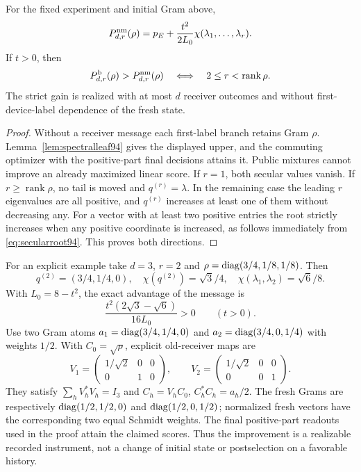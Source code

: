 \begin{corollary}\label{cor:messagevalue94}
For the fixed experiment and initial Gram above,
\begin{equation}\label{eq:nomessage94}
 P_{d,r}^{\rm nm}(\rho)
          =p_E+\frac{t^2}{2L_0}\chi(\lambda_1,\ldots,\lambda_r).
\end{equation}
If $t>0$, then
\begin{equation}\label{eq:messagestrict94}
 P_{d,r}^{\rm b}(\rho)>P_{d,r}^{\rm nm}(\rho)
                 \quad\Longleftrightarrow\quad
                      2\le r<\operatorname{rank}\rho.
\end{equation}
The strict gain is realized with at most $d$ receiver outcomes and
without first-device-label dependence of the fresh state.
\end{corollary}
\begin{proof}
Without a receiver message each first-label branch retains Gram
$\rho$.  Lemma~\ref{lem:spectralleaf94} gives the displayed upper,
and the commuting optimizer with the positive-part final decisions
attains it.  Public mixtures cannot improve an already maximized
linear score.  If $r=1$, both secular values vanish.  If
$r\ge\operatorname{rank}\rho$, no tail is moved and $q^{(r)}=\lambda$.
In the remaining case the leading $r$ eigenvalues are all positive,
and $q^{(r)}$ increases at least one of them without decreasing any.
For a vector with at least two positive entries the root strictly
increases when any positive coordinate is increased, as follows
immediately from \eqref{eq:secularroot94}.  This proves both directions.
\end{proof}

For an explicit example take $d=3$, $r=2$ and
$\rho=\operatorname{diag}(3/4,1/8,1/8)$.  Then
\[
 q^{(2)}=(3/4,1/4,0),\quad
 \chi(q^{(2)})=\sqrt3/4,\quad
 \chi(\lambda_1,\lambda_2)=\sqrt6/8.
\]
With $L_0=8-t^2$, the exact advantage of the message is
\begin{equation}\label{eq:messageexample94}
 \frac{t^2(2\sqrt3-\sqrt6)}{16L_0}>0\qquad(t>0).
\end{equation}
Use two Gram atoms
$a_1=\operatorname{diag}(3/4,1/4,0)$ and $a_2=\operatorname{diag}(3/4,0,1/4)$ with
weights $1/2$.  With $C_0=\sqrt\rho$, explicit old-receiver maps are
\[
 V_1=\begin{pmatrix}1/\sqrt2&0&0\\0&1&0\end{pmatrix},\qquad
 V_2=\begin{pmatrix}1/\sqrt2&0&0\\0&0&1\end{pmatrix}.
\]
They satisfy $\sum_hV_h^*V_h=I_3$ and
$C_h=V_hC_0$, $C_h^*C_h=a_h/2$.
The fresh Grams are respectively
$\operatorname{diag}(1/2,1/2,0)$ and $\operatorname{diag}(1/2,0,1/2)$; normalized fresh
vectors have the corresponding two equal Schmidt weights.  The final
positive-part readouts used in the proof attain the claimed scores.
Thus the improvement is a realizable recorded instrument, not a
change of initial state or postselection on a favorable history.

